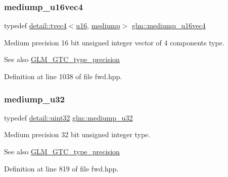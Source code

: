 \subsubsection{\texorpdfstring{mediump\+\_\+u16vec4}{mediump\_u16vec4}}
{\footnotesize\ttfamily typedef \hyperlink{structglm_1_1detail_1_1tvec4}{detail\+::tvec4}$<$\hyperlink{group__gtc__type__precision_gae7a1571503f83d2264ddfa705a6b082a}{u16}, \hyperlink{namespaceglm_a0f04f086094c747d227af4425893f545a6416f3ea0c9025fb21ed50c4d6620482}{mediump}$>$ \hyperlink{group__gtc__type__precision_gaad8b540f4231f69823c39fe9dfcb945a}{glm\+::mediump\+\_\+u16vec4}}

Medium precision 16 bit unsigned integer vector of 4 components type. \begin{DoxySeeAlso}{See also}
\hyperlink{group__gtc__type__precision}{G\+L\+M\+\_\+\+G\+T\+C\+\_\+type\+\_\+precision} 
\end{DoxySeeAlso}


Definition at line 1038 of file fwd.\+hpp.

\mbox{\label{group__gtc__type__precision_gad0c27a525045c299a92306eb4cd7c13a}} 
\subsubsection{\texorpdfstring{mediump\+\_\+u32}{mediump\_u32}}
{\footnotesize\ttfamily typedef \hyperlink{namespaceglm_1_1detail_ade6cfbf377022aaa391af8cd50489222}{detail\+::uint32} \hyperlink{group__gtc__type__precision_gad0c27a525045c299a92306eb4cd7c13a}{glm\+::mediump\+\_\+u32}}

Medium precision 32 bit unsigned integer type. \begin{DoxySeeAlso}{See also}
\hyperlink{group__gtc__type__precision}{G\+L\+M\+\_\+\+G\+T\+C\+\_\+type\+\_\+precision} 
\end{DoxySeeAlso}


Definition at line 819 of file fwd.\+hpp.

\mbox{\label{group__gtc__type__precision_ga323fb0ed8f492d918b087226db2994f3}} 
